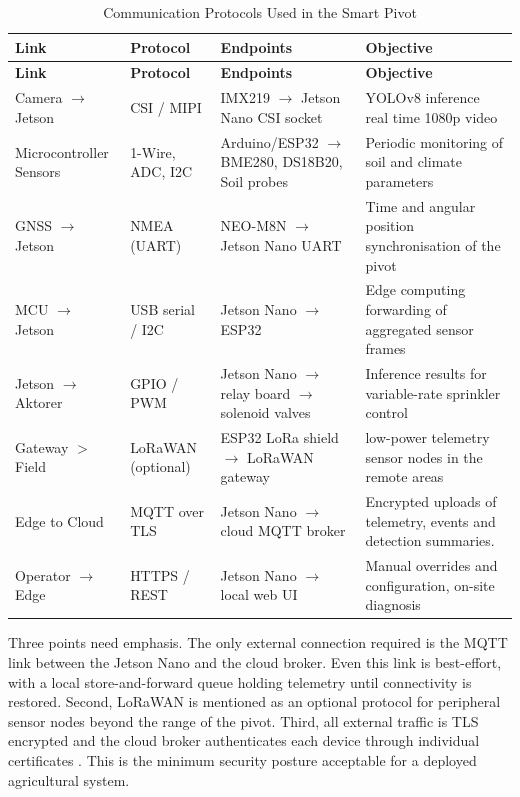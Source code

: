 \documentclass[12pt,a4paper]{report}
\renewcommand{\arraystretch}{1.25}
\begin{document}
\begingroup
\small
\setlength{\parskip}{0pt}
\setlength{\tabcolsep}{4pt}
\renewcommand{\arraystretch}{1.2}
\begin{longtable}{|P{0.18\textwidth}|P{0.18\textwidth}|P{0.28\textwidth}|P{0.28\textwidth}|}
\caption{Communication Protocols Used in the Smart Pivot}\\
\hline
\textbf{Link} & \textbf{Protocol} & \textbf{Endpoints} & \textbf{Objective} \\ \hline
\endfirsthead
\hline
\textbf{Link} & \textbf{Protocol} & \textbf{Endpoints} & \textbf{Objective} \\ \hline
\endhead
Camera $\rightarrow$ Jetson & CSI / MIPI & IMX219 $\rightarrow$ Jetson Nano CSI socket & YOLOv8 inference real time 1080p video \\ \hline
Microcontroller Sensors & 1-Wire, ADC, I2C & Arduino/ESP32 $\rightarrow$ BME280, DS18B20, Soil probes & Periodic monitoring of soil and climate parameters \\ \hline
GNSS $\rightarrow$ Jetson & NMEA (UART) & NEO-M8N $\rightarrow$ Jetson Nano UART & Time and angular position synchronisation of the pivot \\ \hline
MCU $\rightarrow$ Jetson & USB serial / I2C & Jetson Nano $\rightarrow$ ESP32 & Edge computing forwarding of aggregated sensor frames \\ \hline
Jetson $\rightarrow$ Aktorer & GPIO / PWM & Jetson Nano $\rightarrow$ relay board $\rightarrow$ solenoid valves & Inference results for variable-rate sprinkler control \\ \hline
Gateway $>$ Field & LoRaWAN (optional) & ESP32 LoRa shield $\rightarrow$ LoRaWAN gateway & low-power telemetry sensor nodes in the remote areas \\ \hline
Edge to Cloud & MQTT over TLS & Jetson Nano $\rightarrow$ cloud MQTT broker & Encrypted uploads of telemetry, events and detection summaries. \\ \hline
Operator $\rightarrow$ Edge & HTTPS / REST & Jetson Nano $\rightarrow$ local web UI & Manual overrides and configuration, on-site diagnosis \\ \hline
\end{longtable}
\endgroup

Three points need emphasis. The only external connection required is the MQTT link between the Jetson Nano and the cloud broker. Even this link is best-effort, with a local store-and-forward queue holding telemetry until connectivity is restored. Second, LoRaWAN is mentioned as an optional protocol for peripheral sensor nodes beyond the range of the pivot. Third, all external traffic is TLS encrypted and the cloud broker authenticates each device through individual certificates . This is the minimum security posture acceptable for a deployed agricultural system.
\end{document}
